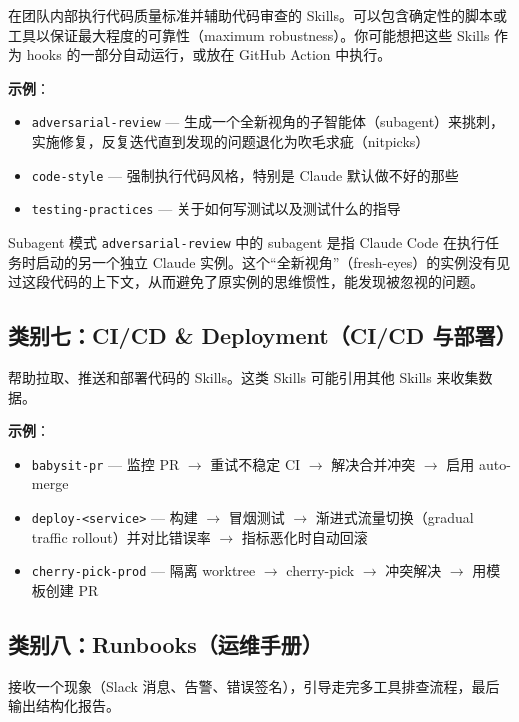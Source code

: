 \documentclass[a4paper]{article}
\begin{document}
在团队内部执行代码质量标准并辅助代码审查的 Skills。可以包含确定性的脚本或工具以保证最大程度的可靠性（maximum robustness）。你可能想把这些 Skills 作为 hooks 的一部分自动运行，或放在 GitHub Action 中执行。

\textbf{示例}：
\begin{itemize}
    \item \texttt{adversarial-review} --- 生成一个全新视角的子智能体（subagent）来挑刺，实施修复，反复迭代直到发现的问题退化为吹毛求疵（nitpicks）
    \item \texttt{code-style} --- 强制执行代码风格，特别是 Claude 默认做不好的那些
    \item \texttt{testing-practices} --- 关于如何写测试以及测试什么的指导
\end{itemize}

\begin{knowledgebox}{Subagent 模式}
\texttt{adversarial-review} 中的 subagent 是指 Claude Code 在执行任务时启动的另一个独立 Claude 实例。这个``全新视角''（fresh-eyes）的实例没有见过这段代码的上下文，从而避免了原实例的思维惯性，能发现被忽视的问题。
\end{knowledgebox}

\subsection{类别七：CI/CD \& Deployment（CI/CD 与部署）}

帮助拉取、推送和部署代码的 Skills。这类 Skills 可能引用其他 Skills 来收集数据。

\textbf{示例}：
\begin{itemize}
    \item \texttt{babysit-pr} --- 监控 PR $\to$ 重试不稳定 CI $\to$ 解决合并冲突 $\to$ 启用 auto-merge
    \item \texttt{deploy-<service>} --- 构建 $\to$ 冒烟测试 $\to$ 渐进式流量切换（gradual traffic rollout）并对比错误率 $\to$ 指标恶化时自动回滚
    \item \texttt{cherry-pick-prod} --- 隔离 worktree $\to$ cherry-pick $\to$ 冲突解决 $\to$ 用模板创建 PR
\end{itemize}

\subsection{类别八：Runbooks（运维手册）}

接收一个现象（Slack 消息、告警、错误签名），引导走完多工具排查流程，最后输出结构化报告。
\end{document}
